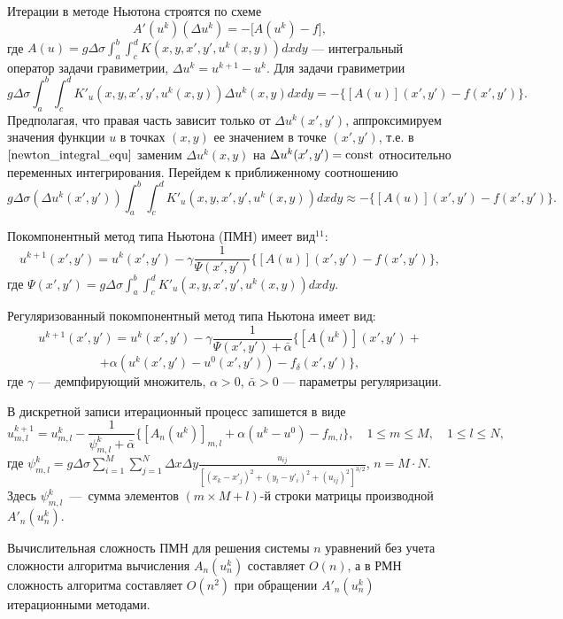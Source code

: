 \documentclass[%
autoref,     %
href,        %
colorlinks,  %
]{disser}
\begin{document}
	Итерации в методе Ньютона строятся по схеме
$$A'(u^k)(\Delta u^k)=-\big[A(u^k)-f\big],$$ где $A(u)=g\Delta\sigma\int_{a}^{b}\int_{c}^{d}K(x,y, x',y',u^k(x,y))dxdy$ --- интегральный оператор задачи гравиметрии, $\Delta u^k=u^{k+1}-u^k$.
Для задачи гравиметрии
\begin{equation}\label{newton_integral_equ}
	g\Delta\sigma\int_{a}^{b}\int_{c}^{d}K'_u(x,y, x',y',u^k(x,y))\Delta u^k(x,y) dxdy=-\{[A(u)](x',y')-f(x',y')\}.
\end{equation}
Предполагая, что правая часть зависит только от $\Delta u^k(x',y')$, аппроксимируем значения функции $u$ в точках $(x,y)$ ее значением в точке $(x',y')$, т.е. в $\eqref{newton_integral_equ}$ заменим  
$\Delta u^k(x,y)$ на $\Delta u^k(x',y')=\textnormal{const}$ относительно переменных интегрирования. Перейдем к приближенному соотношению
$$g\Delta\sigma(\Delta u^k(x',y'))\int_{a}^{b}\int_{c}^{d}K'_u(x,y, x',y',u^k(x,y)) dxdy\approx -\{[A(u)](x',y')-f(x',y')\}.$$


Покомпонентный метод типа Ньютона (ПМН) имеет вид$^{11}$:
$$u^{k+1}(x',y')=u^k(x',y')-\gamma\frac{1}{\varPsi(x',y')}\{[A(u)](x',y')-f(x',y')\},$$
где $\varPsi(x',y')=g\Delta\sigma\int_{a}^{b}\int_{c}^{d}K'_u(x,y, x',y',u^k(x,y)) dxdy.$

Регуляризованный покомпонентный метод типа Ньютона имеет вид:
$$u^{k+1}(x',y')=u^k(x',y')-\gamma\frac{1}{\varPsi(x',y')+\bar{\alpha}}\{[A(u^k)](x',y')+$$ 
$$+\alpha (u^k(x',y')-u^0(x',y'))-f_\delta(x',y')\},$$
где $\gamma$ --- демпфирующий множитель, $\alpha>0$, $\bar{\alpha} >0$ --- параметры регуляризации.

В дискретной записи итерационный процесс запишется в виде
$$u_{m,l}^{k+1}=u_{m,l}^k-\frac{1}{\psi_{m,l}^k+\bar\alpha}\{[A_n(u^k)]_{m,l} + \alpha(u^k-u^0) -f_{m,l}\},\quad 1\le m \le M, \quad 1\le l \le N,$$
{\scriptsize
	\let\thefootnote\relax\let\thefootnote\relax{}
}
где $\psi_{m,l}^k=g\Delta\sigma\sum\limits_{i=1}^{M}\sum\limits_{j=1}^{N}
\Delta x\Delta y\frac{u_{ij}}{[(x_k-x'_j)^2+(y_l-y'_i)^2+(u_{ij})^2]^{3/2}}$, $n=M\cdot N$.
Здесь $\psi_{m,l}^k$~---~сумма элементов $(m\times M + l)$-й строки матрицы производной $A'_n(u_n^k)$. 

Вычислительная сложность ПМН для решения системы $n$ уравнений без учета сложности алгоритма вычисления $A_n(u_n^k)$ составляет $O(n)$, а в РМН сложность алгоритма составляет $O(n^2)$ при обращении $A'_n(u_n^k)$ итерационными методами.
\end{document}
